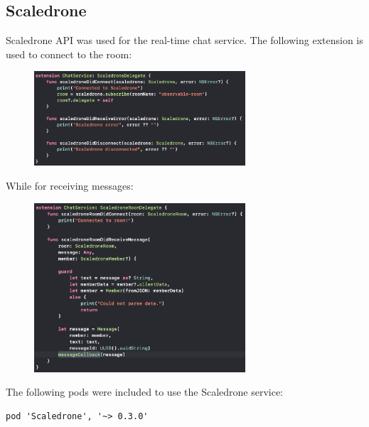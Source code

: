 \documentclass[numbers=noenddot, 12pt, a4paper, oneside]{scrbook}
\begin{document}
\subsection*{Scaledrone}
Scaledrone API was used for the real-time chat service. The following extension is used to connect to the room:
\begin{figure}[H]
	\centering
	\includegraphics[width=0.7\textwidth]{images/ScaledroneConnect}
\end{figure}
While for receiving messages:
\begin{figure}[H]
	\centering
	\includegraphics[width=0.7\textwidth]{images/ScaledroneReceive}
\end{figure}
The following pods were included to use the Scaledrone service:
\begin{lstlisting}[style=CStyle]
pod 'Scaledrone', '~> 0.3.0'
\end{lstlisting}
\end{document}
